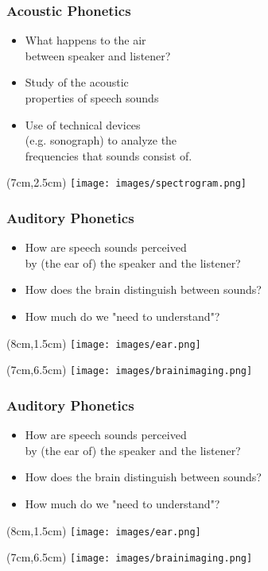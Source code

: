 \documentclass[12pt, table]{beamer}
\begin{document}
\begin{frame}
\frametitle{Acoustic Phonetics}
\begin{itemize}
\item What happens to the air\\
between speaker and listener? 
\item Study of the acoustic\\
properties of speech sounds
\item Use of  technical devices\\
(e.g. sonograph) to analyze the\\
frequencies that sounds consist of.
\end{itemize}
\begin{textblock*}{8cm}(7cm,2.5cm)
\texttt{[image: images/spectrogram.png]}
\end{textblock*}
\end{frame}

\begin{frame}
\frametitle{Auditory Phonetics}
\begin{itemize}
\item How are speech sounds perceived\\
by (the ear of) the speaker and the listener?  
\item How does the brain distinguish between sounds?
\item How much do we "need to understand"?
\end{itemize}
\begin{textblock*}{8cm}(8cm,1.5cm)
\texttt{[image: images/ear.png]}
\end{textblock*}
\begin{textblock*}{8cm}(7cm,6.5cm)
\texttt{[image: images/brainimaging.png]}
\end{textblock*}
\end{frame}

\begin{frame}
\frametitle{Auditory Phonetics}
\begin{itemize}
\item How are speech sounds perceived\\
by (the ear of) the speaker and the listener?  
\item How does the brain distinguish between sounds?
\item How much do we "need to understand"?
\end{itemize}
\begin{textblock*}{8cm}(8cm,1.5cm)
\texttt{[image: images/ear.png]}
\end{textblock*}
\begin{textblock*}{8cm}(7cm,6.5cm)
\texttt{[image: images/brainimaging.png]}
\end{textblock*}
\end{frame}
\end{document}
